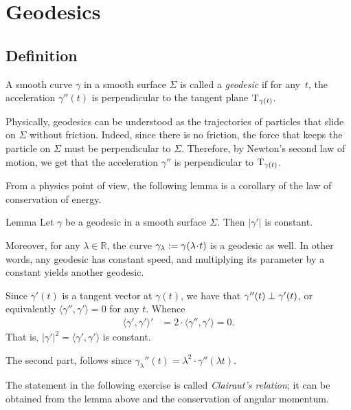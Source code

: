 \chapter{Geodesics}
\label{chap:geodesics}

\section{Definition}

A smooth curve $\gamma$ in a smooth surface $\Sigma$ is called a \emph{geodesic} if for any~$t$, the acceleration $\gamma''(t)$ is perpendicular to the tangent plane $\mathrm{T}_{\gamma(t)}$.

Physically, geodesics can be understood as the trajectories of particles that slide on $\Sigma$ without friction.
Indeed, since there is no friction, the force that keeps the particle on $\Sigma$ must be perpendicular to $\Sigma$.
Therefore, by Newton's second law of motion,
we get that the acceleration $\gamma''$ is perpendicular to $\mathrm{T}_{\gamma(t)}$.

From a physics point of view, the following lemma is a corollary of the law of conservation of energy.


\begin{thm}{Lemma}\label{lem:constant-speed}
Let $\gamma$ be a geodesic in a smooth surface $\Sigma$. 
Then $|\gamma'|$ is constant.

Moreover, for any $\lambda\in\mathbb{R}$, the curve 
$\gamma_{\lambda}\df \gamma (\lambda\cdot t)$ is a geodesic as well. 
In other words, any geodesic has constant speed, and multiplying its parameter by a constant yields another geodesic.
\end{thm}


Since $\gamma'(t)$ is a tangent vector at $\gamma(t)$,
we have that $\gamma''(t)\z\perp\gamma'(t)$, or equivalently $\langle\gamma'',\gamma'\rangle=0$ for any $t$.
Whence 
\begin{align*}
\langle\gamma',\gamma'\rangle'&=2\cdot \langle\gamma'',\gamma'\rangle=0.
\end{align*}
That is, $|\gamma'|^2=\langle\gamma',\gamma'\rangle$ is constant.

The second part, follows since 
$\gamma_{\lambda}''(t) =\lambda^2\cdot \gamma''(\lambda t)$.
\qeds


The statement in the following exercise is called \emph{Clairaut's relation};
it can be obtained from the lemma above and the conservation of angular momentum.

